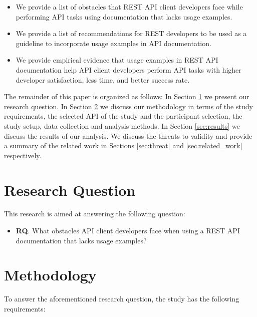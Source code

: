 \documentclass[conference]{IEEEtran}
\begin{document}
\begin{itemize}
  \item We provide a list of obstacles that REST API client developers face while performing API tasks using documentation that lacks usage examples.
  \item We provide a list of recommendations for REST developers to be used as a guideline to incorporate usage examples in API documentation.
  \item We provide empirical evidence that usage examples in REST API documentation help API client developers perform API tasks with higher developer satisfaction, less time, and better success rate.
\end{itemize}

The remainder of this paper is organized as follows: In Section \ref{sec:goal} we present our research question. In Section \ref{sec:method} we discuss our methodology in terms of the study requirements, the selected API of the study and the participant selection, the study setup, data collection and analysis methods. In Section \ref{sec:results} we discuss the results of our analysis. We discuss the threats to validity and provide a summary of the related work in Sections \ref{sec:threat} and  \ref{sec:related_work} respectively.

\section{Research Question}
\label{sec:goal}
This research is aimed at answering the following question:

\begin{itemize}
  \item \textbf{RQ}. What obstacles API client developers face when using a REST API documentation that lacks usage examples?
\end{itemize}

\section{Methodology} %
\label{sec:method}

To answer the aforementioned research question, the study has the following requirements:
\end{document}
